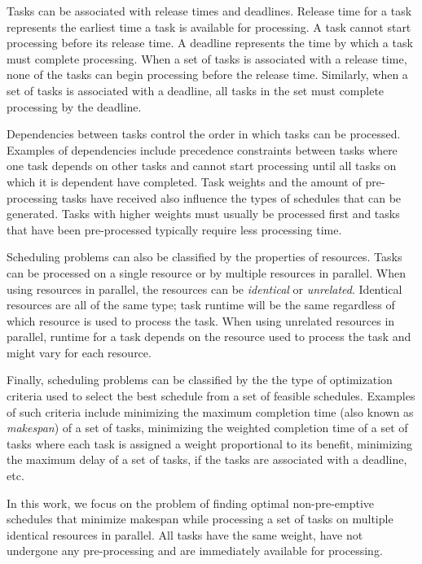 \documentclass[12pt]{report}
\begin{document}
Tasks can be associated with release times and deadlines.
Release time for a task represents the earliest time a task is available for processing.
A task cannot start processing before its release time.
A deadline represents the time by which a task must complete processing.
When a set of tasks is associated with a release time, none of the tasks can begin processing before the release time.
Similarly, when a set of tasks is associated with a deadline, all tasks in the set must complete processing by the deadline.

Dependencies between tasks control the order in which tasks can be processed.
Examples of dependencies include precedence constraints between tasks where one task depends on other tasks and cannot start processing until all tasks on which it is dependent have completed.
Task weights and the amount of pre-processing tasks have received also influence the types of schedules that can be generated.
Tasks with higher weights must usually be processed first and tasks that have been pre-processed typically require less processing time.

Scheduling problems can also be classified by the properties of resources.
Tasks can be processed on a single resource or by multiple resources in parallel.
When using resources in parallel, the resources can be \textit{identical} or \textit{unrelated}.
Identical resources are all of the same type; task runtime will be the same regardless of which resource is used to process the task.
When using unrelated resources in parallel, runtime for a task depends on the resource used to process the task and might vary for each resource.

Finally, scheduling problems can be classified by the the type of optimization criteria used to select the best schedule from a set of feasible schedules.
Examples of such criteria include minimizing the maximum completion time (also known as \textit{makespan}) of a set of tasks, minimizing the weighted completion time of a set of tasks where each task is assigned a weight proportional to its benefit, minimizing the maximum delay of a set of tasks, if the tasks are associated with a deadline, etc.

In this work, we focus on the problem of finding optimal non-pre-emptive schedules that minimize makespan while processing a set of tasks on multiple identical resources in parallel. All tasks have the same weight, have not undergone any pre-processing and are immediately available for processing.

\end{document}
